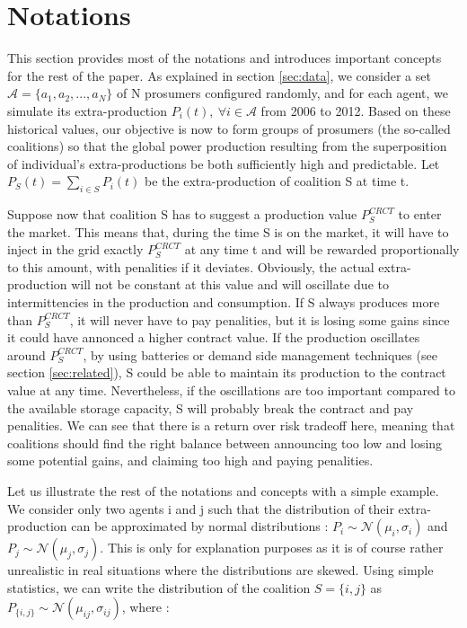 \documentclass[conference]{IEEEtran}
\begin{document}
\section{Notations}
\label{sec:notations}

This section provides most of the notations and introduces important concepts for the rest of the paper. As explained in section \ref{sec:data}, we consider a set $ \mathcal{A} = \{a_{1},a_{2},...,a_{N} \} $ of N prosumers configured randomly, and for each agent, we simulate its extra-production $ P_{i}(t),\ \forall i \in \mathcal{A} $ from 2006 to 2012. Based on these historical values, our objective is now to form groups of prosumers (the so-called coalitions) so that the global power production resulting from the superposition of individual's extra-productions be both sufficiently high and predictable. Let $ P_{S}(t) = \sum_{i \in S} P_{i}(t) $ be the extra-production of coalition S at time t. 

Suppose now that coalition S has to suggest a production value $ P_{S}^{CRCT} $ to enter the market. This means that, during the time S is on the market, it will have to inject in the grid exactly $ P_{S}^{CRCT} $ at any time t and will be rewarded proportionally to this amount, with penalities if it deviates. Obviously, the actual extra-production will not be constant at this value and will oscillate due to intermittencies in the production and consumption. If S always produces more than $ P_{S}^{CRCT} $, it will never have to pay penalities, but it is losing some gains since it could have annonced a higher contract value. If the production oscillates around $ P_{S}^{CRCT} $, by using batteries or demand side management techniques (see section \ref{sec:related}), S could be able to maintain its production to the contract value at any time. Nevertheless, if the oscillations are too important compared to the available storage capacity, S will probably break the contract and pay penalities. We can see that there is a return over risk tradeoff here, meaning that coalitions should find the right balance between announcing too low and losing some potential gains, and claiming too high and paying penalities. 

Let us illustrate the rest of the notations and concepts with a simple example. We consider only two agents i and j such that the distribution of their extra-production can be approximated by normal distributions : $ P_{i} \sim \mathcal{N}(\mu_{i}, \sigma_{i} ) $ and $ P_{j} \sim \mathcal{N}(\mu_{j}, \sigma_{j} ) $. This is only for explanation purposes as it is of course rather unrealistic in real situations where the distributions are skewed. Using simple statistics, we can write the distribution of the coalition $ S = \{i,j\} $ as $ P_{\{i,j\}} \sim \mathcal{N}(\mu_{ij}, \sigma_{ij}) $, where :
\end{document}
